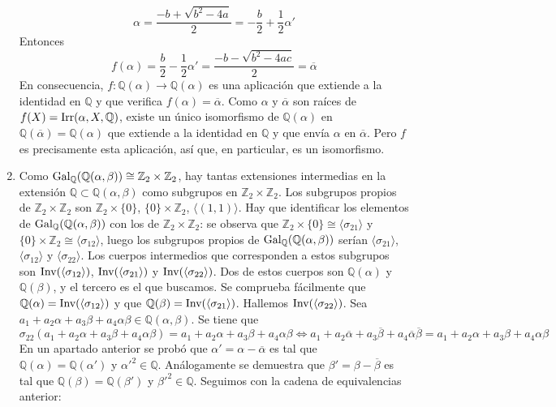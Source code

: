 \documentclass[11pt]{report}
\makeatletter
\renewenvironment{proof}[1][\proofname]{\par
  \pushQED{\qed}%
  \normalfont \topsep\z@skip %
  \trivlist
  \item[\hskip\labelsep
        \itshape
    #1\@addpunct{.}]\ignorespaces
}{%
  \popQED\endtrivlist\@endpefalse
}
\newcommand{\Z}{\mathbb Z}
\newcommand{\Q}{\mathbb Q}
\makeatother
\begin{document}
\begin{proof}
\begin{enumerate}
    \[\alpha = \frac{-b+\sqrt{b^2-4a}}{2} = -\frac{b}{2}+\frac{1}{2}\alpha'\]
    Entonces
    \[f(\alpha) = \frac{b}{2}-\frac{1}{2}\alpha' = \frac{-b-\sqrt{b^2-4ac}}{2} = \overline{\alpha}\]
    En consecuencia, $f \colon \Q(\alpha) \to \Q(\alpha)$ es una aplicación que extiende a la identidad en $\Q$ y que verifica $f(\alpha) = \overline{\alpha}$. Como $\alpha$ y $\overline{\alpha}$ son raíces de $f(X) = \textup{Irr}(\alpha,X,\Q)$, existe un único isomorfismo de $\Q(\alpha)$ en $\Q(\overline{\alpha}) = \Q(\alpha)$ que extiende a la identidad en $\Q$ y que envía $\alpha$ en $\overline{\alpha}$. Pero $f$ es precisamente esta aplicación, así que, en particular, es un isomorfismo.
    \item Como $\textup{Gal}_\Q(\Q(\alpha,\beta)) \cong \Z_2 \times \Z_2$, hay tantas extensiones intermedias en la extensión $\Q \subset \Q(\alpha,\beta)$ como subgrupos en $\Z_2 \times \Z_2$. Los subgrupos propios de $\Z_2 \times \Z_2$ son $\Z_2 \times \{0\}$, $\{0\} \times \Z_2$, $\langle(1,1)\rangle$. Hay que identificar los elementos de $\textup{Gal}_\Q(\Q(\alpha,\beta))$ con los de $\Z_2 \times \Z_2$: se observa que $\Z_2 \times \{0\} \cong \langle \sigma_{21}\rangle$ y $\{0\} \times \Z_2 \cong \langle \sigma_{12}\rangle$, luego los subgrupos propios de $\textup{Gal}_\Q(\Q(\alpha,\beta))$ serían $\langle \sigma_{21}\rangle$, $\langle \sigma_{12}\rangle$ y $\langle \sigma_{22} \rangle$. Los cuerpos intermedios que corresponden a estos subgrupos son $\textup{Inv}(\langle \sigma_{12} \rangle)$, $\textup{Inv}(\langle \sigma_{21} \rangle)$ y $\textup{Inv}(\langle \sigma_{22} \rangle)$. Dos de estos cuerpos son $\Q(\alpha)$ y $\Q(\beta)$, y el tercero es el que buscamos. Se comprueba fácilmente que $\Q(\alpha) = \textup{Inv}(\langle \sigma_{12}\rangle)$ y que $\Q(\beta) = \textup{Inv}(\langle \sigma_{21}\rangle)$. Hallemos $\textup{Inv}(\langle \sigma_{22} \rangle)$. Sea $a_{1}+a_{2}\alpha +a_{3}\beta+a_4\alpha\beta\in \Q(\alpha,\beta)$. Se tiene que
    \[\scriptstyle
        \sigma_{22}(a_{1}+a_{2}\alpha +a_{3}\beta+a_4\alpha\beta) = a_{1}+a_{2}\alpha +a_{3}{\beta}+a_4\alpha{\beta} \iff a_{1}+a_{2}\overline{\alpha} +a_{3}\overline{\beta}+a_4\overline{\alpha}\overline{\beta} = a_{1}+a_{2}\alpha +a_{3}{\beta}+a_4\alpha{\beta} \tag{$\ast$}\]
    En un apartado anterior se probó que $\alpha' = \alpha-\overline{\alpha}$ es tal que $\Q(\alpha)=\Q(\alpha')$ y $\alpha'^2 \in \Q$. Análogamente se demuestra que $\beta' = \beta-\overline{\beta}$ es tal que $\Q(\beta)=\Q(\beta')$ y $\beta'^2 \in \Q$. Seguimos con la cadena de equivalencias anterior:

\end{enumerate}
\end{proof}
\end{document}
